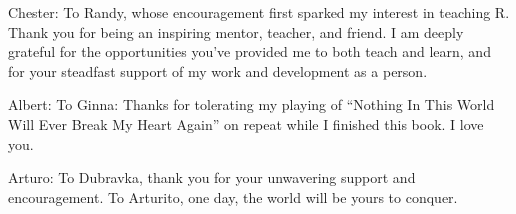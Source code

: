 \cleardoublepage\newpage
\thispagestyle{empty}

\vspace*{2in}

\begin{center}
Chester: To Randy, whose encouragement first sparked my interest in teaching R. Thank you for being an inspiring mentor, teacher, and friend. I am deeply grateful for the opportunities you've provided me to both teach and learn, and for your steadfast support of my work and development as a person.
\vspace{0.3in}

Albert:  \selectfont To Ginna: Thanks for tolerating my playing of ``Nothing In This World Will Ever Break My Heart Again'' on repeat while I finished this book. I love you.

\vspace{0.3in}

Arturo: To Dubravka, thank you for your unwavering support and encouragement. To Arturito, one day, the world will be yours to conquer.

\end{center}

\setlength{\abovedisplayskip}{-5pt}
\setlength{\abovedisplayshortskip}{-5pt}
